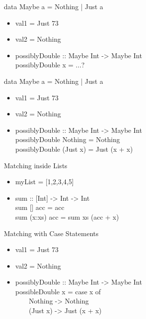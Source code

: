 \documentclass{beamer}                  %
\newcommand{\srule}{
	\rule{\textwidth}{1pt}\\
}
\newlength{\subsecwidth}
\newenvironment{slide}{
	\begin{frame} %
	\settowidth{\subsecwidth}{\insertsubsection} %
	\ifthenelse{\dimtest{\subsecwidth}{<}{1pt}}{ %
		\frametitle{\insertsection\\             %
		\vspace{-1ex}                            %
		\color{fore}\srule                       %
		\par                                     %
		\vspace{-3ex}                            %
		}
	}{                                           %
		\frametitle{\insertsection\ -- \insertsubsection\\ %
		\vspace{-1ex}                            %
		\color{fore}\srule                       %
		\par                                     %
		\vspace{-3ex}                            %
		}
	}
	\Large                                       %
}{
	\end{frame}
}
\begin{document}
\begin{slide}
  data Maybe a = Nothing | Just a
  \begin{itemize}
    \item val1 = Just 73
    \item val2 = Nothing
    \item possiblyDouble :: Maybe Int -> Maybe Int\\
      possiblyDouble x = ...?
  \end{itemize}
\end{slide}

\begin{slide}
  data Maybe a = Nothing | Just a
  \begin{itemize}
    \item val1 = Just 73
    \item val2 = Nothing
    \item possiblyDouble :: Maybe Int -> Maybe Int\\
      possiblyDouble Nothing = Nothing\\
      possiblyDouble (Just x) = Just (x + x)
  \end{itemize}
\end{slide}

\begin{slide}
  Matching inside Lists
  \begin{itemize}
    \item myList = [1,2,3,4,5]
    \item sum :: [Int] -> Int -> Int\\
          sum [] acc     = acc\\
          sum (x:xs) acc = sum xs (acc + x)
  \end{itemize}
\end{slide}

\begin{slide}
  Matching with Case Statements
  \begin{itemize}
    \item val1 = Just 73
    \item val2 = Nothing
    \item possiblyDouble :: Maybe Int -> Maybe Int\\
      possibleDouble x = case x of\\
      ~~~~Nothing -> Nothing\\
      ~~~~(Just x) -> Just (x + x)
  \end{itemize}
\end{slide}
\end{document}
